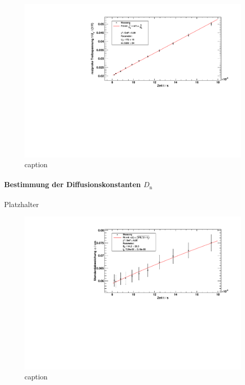 \begin{figure}[H]
\begin{center}
  \includegraphics[width=\textwidth]{../img/part2/volt_fitXc.pdf}
  \caption{caption}
  \label{img:volt:fitxc}
\end{center}
\end{figure}

\paragraph{Bestimmung der Diffusionskonstanten $D_\text{n}$}
Platzhalter

\begin{figure}[H]
\begin{center}
  \includegraphics[width=\textwidth]{../img/part2/volt_fitSigma.pdf}
  \caption{caption}
  \label{img:volt:fitsigma}
\end{center}
\end{figure}

